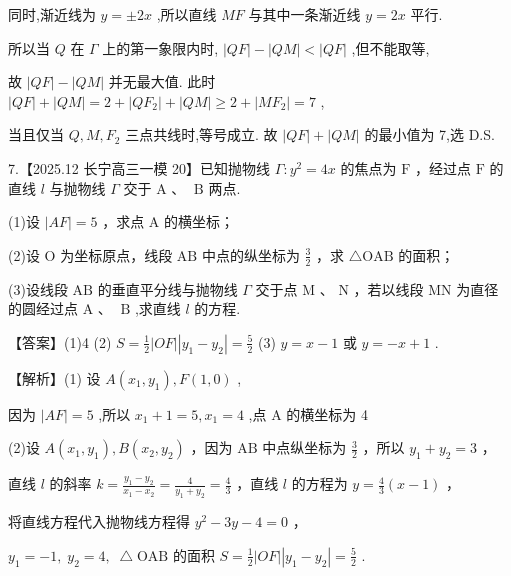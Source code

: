 \documentclass[10pt]{article}
\begin{document}
同时,渐近线为 \(y =  \pm  {2x}\) ,所以直线 \({MF}\) 与其中一条渐近线 \(y = {2x}\) 平行.

所以当 \(Q\) 在 \(\Gamma\) 上的第一象限内时, \(\left| {QF}\right|  - \left| {QM}\right|  < \left| {QF}\right|\) ,但不能取等,

故 \(\left| {QF}\right|  - \left| {QM}\right|\) 并无最大值. 此时 \(\left| {QF}\right|  + \left| {QM}\right|  = 2 + \left| {Q{F}_{2}}\right|  + \left| {QM}\right|  \geq  2 + \left| {M{F}_{2}}\right|  = 7\) ,

当且仅当 \(Q,M,{F}_{2}\) 三点共线时,等号成立. 故 \(\left| {QF}\right|  + \left| {QM}\right|\) 的最小值为 7,选 D.S.

7.【2025.12 长宁高三一模 20】已知抛物线 \(\Gamma  : {y}^{2} = {4x}\) 的焦点为 \(\mathrm{F}\) ，经过点 \(\mathrm{F}\) 的直线 \(l\) 与抛物线 \(\Gamma\) 交于 \(\mathrm{A}\text{ 、 }\mathrm{\;B}\) 两点.

(1)设 \(\left| {AF}\right|  = 5\) ，求点 \(\mathrm{A}\) 的横坐标；

(2)设 \(\mathrm{O}\) 为坐标原点，线段 \(\mathrm{{AB}}\) 中点的纵坐标为 \(\frac{3}{2}\) ，求 \(\bigtriangleup  \mathrm{{OAB}}\) 的面积；

(3)设线段 \(\mathrm{{AB}}\) 的垂直平分线与抛物线 \(\Gamma\) 交于点 \(\mathrm{M}\) 、 \(\mathrm{N}\) ，若以线段 \(\mathrm{{MN}}\) 为直径的圆经过点 \(\mathrm{A}\text{ 、 }\mathrm{\;B}\) ,求直线 \(l\) 的方程.

【答案】(1)4 (2) \(S = \frac{1}{2}\left| {OF}\right| \left| {{y}_{1} - {y}_{2}}\right|  = \frac{5}{2}\) (3) \(y = x - 1\) 或 \(y =  - x + 1\) .

【解析】(1) 设 \(A\left( {{x}_{1},{y}_{1}}\right) ,F\left( {1,0}\right)\) ,

因为 \(\left| {AF}\right|  = 5\) ,所以 \({x}_{1} + 1 = 5,{x}_{1} = 4\) ,点 \(\mathrm{A}\) 的横坐标为 4

(2)设 \(A\left( {{x}_{1},{y}_{1}}\right) ,B\left( {{x}_{2},{y}_{2}}\right)\) ，因为 \(\mathrm{{AB}}\) 中点纵坐标为 \(\frac{3}{2}\) ，所以 \({y}_{1} + {y}_{2} = 3\) ，

直线 \(l\) 的斜率 \(k = \frac{{y}_{1} - {y}_{2}}{{x}_{1} - {x}_{2}} = \frac{4}{{y}_{1} + {y}_{2}} = \frac{4}{3}\) ，直线 \(l\) 的方程为 \(y = \frac{4}{3}\left( {x - 1}\right)\) ，

将直线方程代入抛物线方程得 \({y}^{2} - {3y} - 4 = 0\) ，

\({y}_{1} =  - 1,\;{y}_{2} = 4,\;\bigtriangleup \mathrm{{OAB}}\) 的面积 \(S = \frac{1}{2}\left| {OF}\right| \left| {{y}_{1} - {y}_{2}}\right|  = \frac{5}{2}\) .
\end{document}
